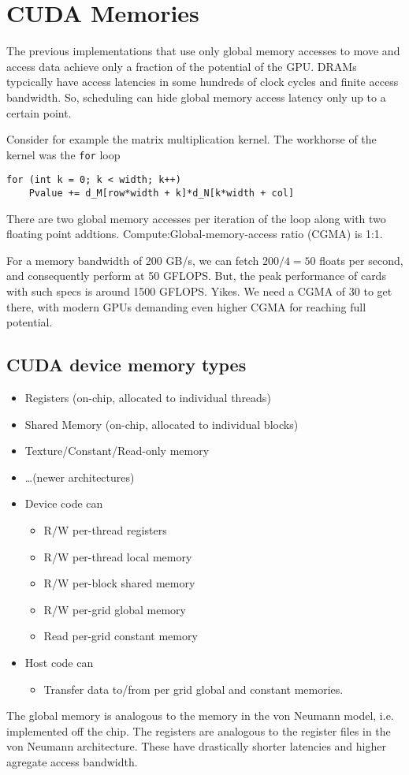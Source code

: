 \section*{CUDA Memories}
The previous implementations that use only global memory accesses
to move and access data achieve only a fraction of the potential
of the GPU. DRAMs typcically have access latencies in some hundreds
of clock cycles and finite access bandwidth. So, scheduling can
hide global memory access latency only up to a certain point.

Consider for example the matrix multiplication kernel. The workhorse
of the kernel was the \texttt{for} loop
\begin{verbatim}
for (int k = 0; k < width; k++)
    Pvalue += d_M[row*width + k]*d_N[k*width + col]
\end{verbatim}
There are two global memory accesses per iteration of the loop along
with two floating point addtions. Compute:Global-memory-access ratio
(CGMA) is 1:1.

For a memory bandwidth of 200 GB/s, we can fetch $200 / 4 = 50$ floats
per second, and consequently perform at 50 GFLOPS. But, the peak
performance of cards with such specs is around 1500 GFLOPS. Yikes.
We need a CGMA of 30 to get there, with modern GPUs demanding even
higher CGMA for reaching full potential.

\subsection*{CUDA device memory types}
\begin{itemize}
    \item Registers (on-chip, allocated to individual threads)
    \item Shared Memory (on-chip, allocated to individual blocks)
    \item Texture/Constant/Read-only memory
    \item \ldots (newer architectures)
\end{itemize}

\begin{itemize}
    \item Device code can
        \begin{itemize}
            \item R/W per-thread registers
            \item R/W per-thread local memory
            \item R/W per-block shared memory
            \item R/W per-grid global memory
            \item Read per-grid constant memory
        \end{itemize}
    \item Host code can
        \begin{itemize}
            \item Transfer data to/from per grid global and constant
                memories.
        \end{itemize}
\end{itemize}

The global memory is analogous to the memory in the von Neumann model,
 i.e. implemented off the chip. The registers are analogous to the 
 register files in the von Neumann architecture. These have
 drastically shorter latencies and higher agregate access bandwidth.
